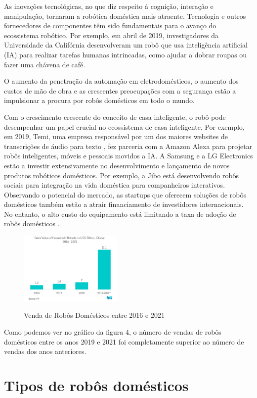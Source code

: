 \documentclass[10pt]{article}
\begin{document}
As inovações tecnológicas, no que diz respeito à cognição, interação e manipulação, tornaram a robótica doméstica mais atraente. Tecnologia e outros fornecedores de componentes têm sido fundamentais para o avanço do ecossistema robótico. Por exemplo, em abril de 2019, investigadores da Universidade da Califórnia desenvolveram um robô que usa inteligência artificial (IA) para realizar tarefas humanas intrincadas, como ajudar a dobrar roupas ou fazer uma chávena de café. 

O aumento da penetração da automação em eletrodomésticos, o aumento dos custos de mão de obra e as crescentes preocupações com a segurança estão a impulsionar a procura por robôs domésticos em todo o mundo. 

Com o crescimento crescente do conceito de casa inteligente, o robô pode desempenhar um papel crucial no ecossistema de casa inteligente. Por exemplo, em 2019, Temi, uma empresa responsável por um dos maiores websites de transcrições de áudio para texto \cite{temi}, fez parceria com a Amazon Alexa para projetar robôs inteligentes, móveis e pessoais movidos a IA. A Samsung e a LG Electronics estão a investir extensivamente no desenvolvimento e lançamento de novos produtos robóticos domésticos. Por exemplo, a Jibo está desenvolvendo robôs sociais para integração na vida doméstica para companheiros interativos. Observando o potencial do mercado, as startups que oferecem soluções de robôs domésticos também estão a atrair financiamento de investidores internacionais. No entanto, o alto custo do equipamento está limitando a taxa de adoção de robôs domésticos \cite{market}.

\begin{figure}[h]
\caption{Venda de Robôs Domésticos entre 2016 e 2021}
\centering
\includegraphics[width = 5cm]{img/6.png}
\label{figura:6}
\end{figure}

Como podemos ver no gráfico da figura 4, o número de vendas de robôs domésticos entre os anos 2019 e 2021 foi completamente superior ao número de vendas dos anos anteriores.


\section{Tipos de robôs domésticos}
\end{document}
